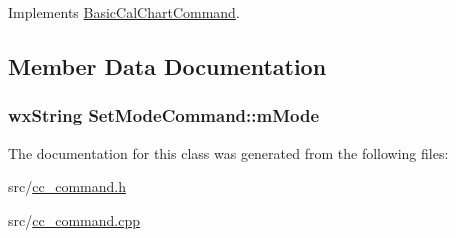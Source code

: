 Implements \hyperlink{a00018_ab6f65965601103020ea8276abf88313a}{Basic\-Cal\-Chart\-Command}.



\subsection{Member Data Documentation}
\hypertarget{a00130_a61a3c7ac103154dfaa9329160ccb9387}{
\subsubsection[{m\-Mode}]{\setlength{\rightskip}{0pt plus 5cm}wx\-String Set\-Mode\-Command\-::m\-Mode\hspace{0.3cm}{\ttfamily [protected]}}}\label{a00130_a61a3c7ac103154dfaa9329160ccb9387}


The documentation for this class was generated from the following files\-:\begin{DoxyCompactItemize}
\item 
src/\hyperlink{a00183}{cc\-\_\-command.\-h}\item 
src/\hyperlink{a00182}{cc\-\_\-command.\-cpp}\end{DoxyCompactItemize}
